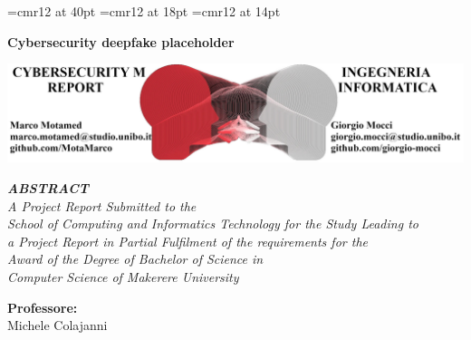 \begin{titlepage}

\begin{center}
\font\myfont=cmr12 at 40pt
\font\abstractfont=cmr12 at 18pt
\font\customfont=cmr12 at 14pt

\Large \textbf{{\myfont Cybersecurity deepfake placeholder}}

\vspace{2em}%
\includegraphics[width=1\textwidth]{logo.jpg}\\%


 \vspace{3em}%


\emph{\customfont \textbf{{\abstractfont} ABSTRACT\textbf{}} \\  A Project Report Submitted to the \\School of Computing and Informatics Technology
for the Study Leading to\\ a Project Report in Partial Fulfilment of the
requirements for the\\ Award of the Degree of Bachelor of Science in \\Computer Science
of Makerere University}

        \vspace{1in}

       

\normalsize {\customfont \textbf{Professore: }\\

Michele Colajanni}\\
\vspace{1em}



\end{center}
\end{titlepage}
